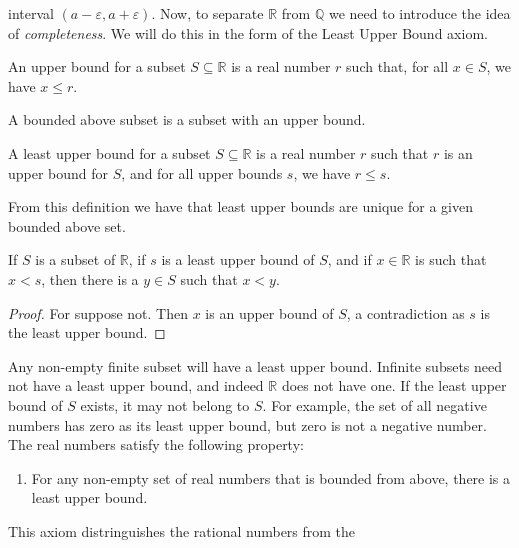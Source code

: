             interval $(a-\varepsilon,a+\varepsilon)$. Now, to
            separate $\mathbb{R}$ from $\mathbb{Q}$ we need
            to introduce the idea of \textit{completeness}.
            We will do this in the form of the Least Upper
            Bound axiom.
            \begin{definition}
                An upper bound for a subset $S\subseteq\mathbb{R}$
                is a real number $r$ such that, for all $x\in{S}$,
                we have $x\leq{r}$.
            \end{definition}
            A bounded above subset is a subset with an upper bound.
            \begin{definition}
                A least upper bound for a subset
                $S\subseteq\mathbb{R}$ is a real number $r$ such
                that $r$ is an upper bound
                for $S$, and for all upper bounds $s$, we have
                $r\leq{s}$.
            \end{definition}
            From this definition we have that least upper bounds are
            unique for a given bounded above set.
            \begin{theorem}
                If $S$ is a subset of $\mathbb{R}$, if $s$ is a
                least upper bound of $S$, and if $x\in\mathbb{R}$
                is such that $x<s$, then there is a $y\in{S}$
                such that $x<y$.
            \end{theorem}
            \begin{proof}
                For suppose not. Then $x$ is an upper bound of $S$,
                a contradiction as $s$ is the least upper bound.
            \end{proof}
            Any non-empty finite subset will have a least
            upper bound. Infinite subsets need not have a least
            upper bound, and indeed $\mathbb{R}$ does not have
            one. If the least upper bound of $S$ exists, it may
            not belong to $S$. For example, the set of all
            negative numbers has zero as its least upper bound,
            but zero is not a negative number. The real
            numbers satisfy the following property:
            \begin{enumerate}
                \item For any non-empty set of real numbers that
                      is bounded from above, there is a least
                      upper bound.
            \end{enumerate}
            This axiom distringuishes the rational numbers from the
